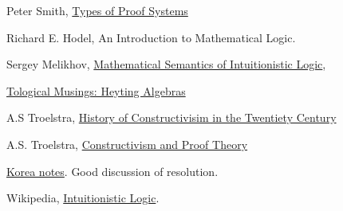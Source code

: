 \begin{thebibliography}
 Peter Smith, \href{https://www.logicmatters.net/resources/pdfs/ProofSystems.pdf}{Types of Proof Systems}

 Richard E. Hodel, An Introduction to Mathematical Logic.  

 Sergey Melikhov, \href{https://arxiv.org/pdf/1504.03380.pdf}{Mathematical Semantics of Intuitionistic Logic}, 

 \href{https://topologicalmusings.wordpress.com/2008/04/08/distributivity-topology-and-heyting-algebras/}{Tological Musings: Heyting Algebras}

 A.S Troelstra, \href{http://www.illc.uva.nl/Research/Publications/Reports/ML-1991-05.text.pdf}{History of Constructivisim in the Twentiety Century}

 A.S. Troelstra, \href{http://citeseerx.ist.psu.edu/viewdoc/download?doi=10.1.1.10.6972&rep=rep1&type=pdf}{Constructivism and Proof Theory}

 \href{http://www1.se.cuhk.edu.hk/~seem5750/Lecture_6.pdf}{Korea notes}. Good discussion of resolution.

 Wikipedia, \href{https://en.wikipedia.org/wiki/Intuitionistic_logic}{Intuitionistic Logic}. 

\end{thebibliography}
